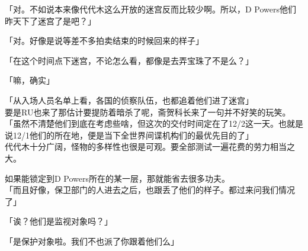 「对。不如说本来像代代木这么开放的迷宫反而比较少啊。所以，D Powers他们昨天下了迷宫了是吧？」

「对。好像是说等差不多拍卖结束的时候回来的样子」

「在这个时间点下迷宫，不论怎么看，都像是去弄宝珠了不是么？」

「嘛，确实」

「从入场人员名单上看，各国的侦察队伍，也都追着他们进了迷宫」\\

要是RU也来了那估计要提防着暗杀了呢，斋贺科长来了一句并不好笑的玩笑。\\

「虽然不清楚他们到底在考虑些啥，但这次的交付时间定在了12/2这一天。也就是说12/1他们的所在地，便是当下全世界间谍机构们的最优先目的了」\\

代代木十分广阔，怪物的多样性也很是可观。要全部测试一遍花费的劳力相当之大。

如果能锁定到D Powers所在的某一层，那就能省去很多功夫。\\

「而且好像，保卫部门的人进去之后，也跟丢了他们的样子。都过来问我们情况了」

「诶？他们是监视对象吗？」

「是保护对象啦。我们不也派了你跟着他们么」\\

